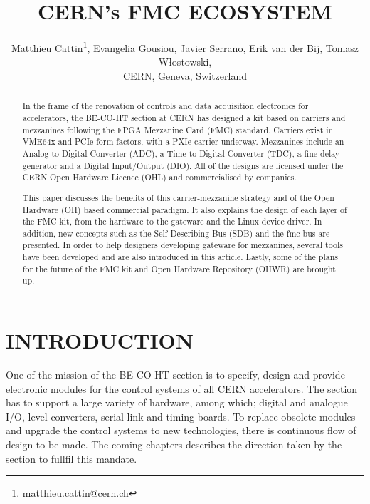 \documentclass{JAC2003}
\begin{document}
\title{CERN's FMC ECOSYSTEM}

\author{Matthieu Cattin\thanks{matthieu.cattin@cern.ch}, Evangelia Gousiou, Javier Serrano, Erik van der Bij, Tomasz W\l{}ostowski,\\
CERN, Geneva, Switzerland}

\maketitle

\begin{abstract}
  In the frame of the renovation of controls and data acquisition electronics for accelerators, the BE-CO-HT section at CERN has designed a kit based on carriers and mezzanines following the FPGA Mezzanine Card (FMC) standard. Carriers exist in VME64x and PCIe form factors, with a PXIe carrier underway. Mezzanines include an Analog to Digital Converter (ADC), a Time to Digital Converter (TDC), a fine delay generator and a Digital Input/Output (DIO). All of the designs are licensed under the CERN Open Hardware Licence (OHL) and commercialised by companies.

This paper discusses the benefits of this carrier-mezzanine strategy and of the Open Hardware (OH) based commercial paradigm.
It also explains the design of each layer of the FMC kit, from the hardware to the gateware and the Linux device driver.
In addition, new concepts such as the Self-Describing Bus (SDB) and the fmc-bus are presented.
In order to help designers developing gateware for mezzanines, several tools have been developed and are also introduced in this article.
Lastly, some of the plans for the future of the FMC kit and Open Hardware Repository (OHWR) are brought up.
\end{abstract}

\section{INTRODUCTION}
One of the mission of the BE-CO-HT section is to specify, design and provide electronic modules for the control systems of all CERN accelerators.
The section has to support a large variety of hardware, among which; digital and analogue I/O, level converters, serial link and timing boards.
To replace obsolete modules and upgrade the control systems to new technologies, there is continuous flow of design to be made.
The coming chapters describes the direction taken by the section to fullfil this mandate.
\end{document}

